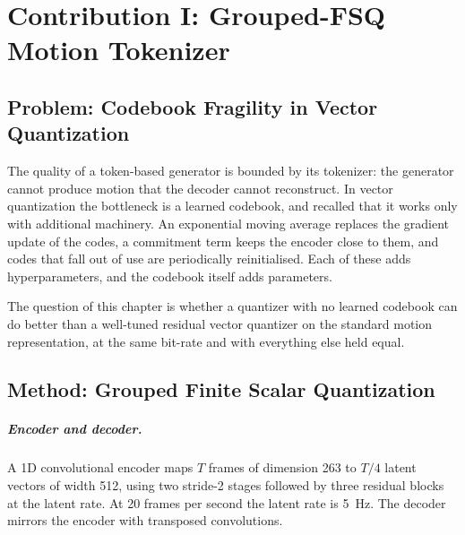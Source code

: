 \chapter{Contribution I: Grouped-FSQ Motion Tokenizer}
\label{chap:tokenizer}

\section{Problem: Codebook Fragility in Vector Quantization}
\label{sec:tok_problem}

The quality of a token-based generator is bounded by its tokenizer: the generator cannot produce motion that the decoder cannot reconstruct. In vector quantization the bottleneck is a learned codebook, and  recalled that it works only with additional machinery. An exponential moving average replaces the gradient update of the codes, a commitment term keeps the encoder close to them, and codes that fall out of use are periodically reinitialised. Each of these adds hyperparameters, and the codebook itself adds parameters.

The question of this chapter is whether a quantizer with no learned codebook can do better than a well-tuned residual vector quantizer on the standard motion representation, at the same bit-rate and with everything else held equal.

\section{Method: Grouped Finite Scalar Quantization}
\label{sec:tok_method}

\paragraph{Encoder and decoder.} A 1D convolutional encoder maps $T$ frames of dimension 263 to $T/4$ latent vectors of width 512, using two stride-2 stages followed by three residual blocks at the latent rate. At 20 frames per second the latent rate is 5~Hz. The decoder mirrors the encoder with transposed convolutions.


